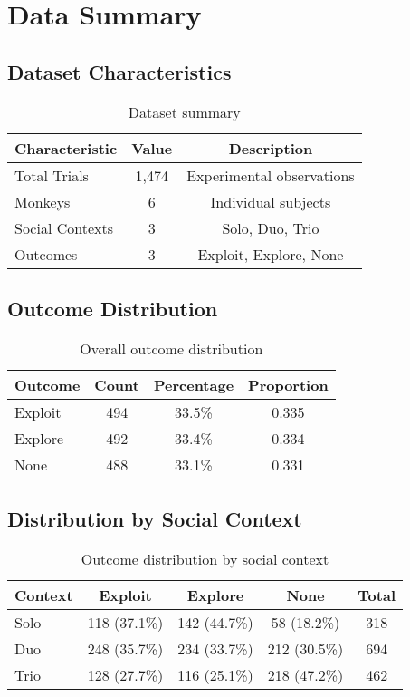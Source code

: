 \documentclass[11pt]{article}
\begin{document}
\section{Data Summary}

\subsection{Dataset Characteristics}

\begin{table}[h]
\centering
\begin{tabular}{lcc}
\toprule
\textbf{Characteristic} & \textbf{Value} & \textbf{Description} \\
\midrule
Total Trials & 1,474 & Experimental observations \\
Monkeys & 6 & Individual subjects \\
Social Contexts & 3 & Solo, Duo, Trio \\
Outcomes & 3 & Exploit, Explore, None \\
\bottomrule
\end{tabular}
\caption{Dataset summary}
\end{table}

\subsection{Outcome Distribution}

\begin{table}[h]
\centering
\begin{tabular}{lccc}
\toprule
\textbf{Outcome} & \textbf{Count} & \textbf{Percentage} & \textbf{Proportion} \\
\midrule
Exploit & 494 & 33.5\% & 0.335 \\
Explore & 492 & 33.4\% & 0.334 \\
None & 488 & 33.1\% & 0.331 \\
\bottomrule
\end{tabular}
\caption{Overall outcome distribution}
\end{table}

\subsection{Distribution by Social Context}

\begin{table}[h]
\centering
\begin{tabular}{lcccc}
\toprule
\textbf{Context} & \textbf{Exploit} & \textbf{Explore} & \textbf{None} & \textbf{Total} \\
\midrule
Solo & 118 (37.1\%) & 142 (44.7\%) & 58 (18.2\%) & 318 \\
Duo & 248 (35.7\%) & 234 (33.7\%) & 212 (30.5\%) & 694 \\
Trio & 128 (27.7\%) & 116 (25.1\%) & 218 (47.2\%) & 462 \\
\bottomrule
\end{tabular}
\caption{Outcome distribution by social context}
\end{table}
\end{document}
